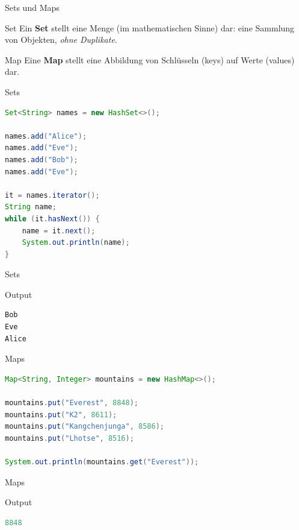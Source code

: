 \documentclass[18pt]{beamer}
\begin{document}
\begin{frame}{Sets und Maps}
    \begin{block}{Set}
        Ein \textbf{Set} stellt eine Menge (im mathematischen Sinne) dar: eine Sammlung von Objekten, \textit{ohne Duplikate}.
    \end{block}

    \begin{block}{Map}
        Eine \textbf{Map} stellt eine Abbildung von Schlüsseln (keys) auf Werte (values) dar.
    \end{block}
\end{frame}

\begin{frame}[fragile]{Sets}
    \begin{lstlisting}[language=Java,basicstyle=\scriptsize]
Set<String> names = new HashSet<>();

names.add("Alice");
names.add("Eve");
names.add("Bob");
names.add("Eve");

it = names.iterator();
String name;
while (it.hasNext()) {
    name = it.next();
    System.out.println(name);
}
    \end{lstlisting}

\end{frame}

\begin{frame}[fragile]{Sets}
    \begin{exampleblock}{Output}
        \begin{lstlisting}[language=Java]
Bob
Eve
Alice
        \end{lstlisting}
    \end{exampleblock}

\end{frame}


\begin{frame}[fragile]{Maps}
    \begin{lstlisting}[language=Java,basicstyle=\scriptsize]
Map<String, Integer> mountains = new HashMap<>();

mountains.put("Everest", 8848);
mountains.put("K2", 8611);
mountains.put("Kangchenjunga", 8586);
mountains.put("Lhotse", 8516);

System.out.println(mountains.get("Everest"));
    \end{lstlisting}
\end{frame}

\begin{frame}[fragile]{Maps}

    \begin{exampleblock}{Output}
        \begin{lstlisting}[language=Java]
8848
        \end{lstlisting}

    \end{exampleblock}
\end{frame}
\end{document}
